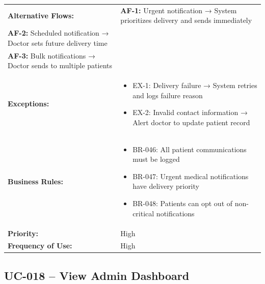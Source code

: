 \documentclass[12pt,a4paper]{article}
\begin{document}
\begin{longtable}{|p{4.5cm}|p{10.5cm}|}
\hline
\textbf{Alternative Flows:} &
\textbf{AF-1:} Urgent notification → System prioritizes delivery and sends immediately \\
\textbf{AF-2:} Scheduled notification → Doctor sets future delivery time \\
\textbf{AF-3:} Bulk notifications → Doctor sends to multiple patients \\
\hline
\textbf{Exceptions:} &
\begin{itemize}
  \item EX-1: Delivery failure → System retries and logs failure reason
  \item EX-2: Invalid contact information → Alert doctor to update patient record
\end{itemize} \\
\hline
\textbf{Business Rules:} &
\begin{itemize}
  \item BR-046: All patient communications must be logged
  \item BR-047: Urgent medical notifications have delivery priority
  \item BR-048: Patients can opt out of non-critical notifications
\end{itemize} \\
\hline
\textbf{Priority:} & High \\
\hline
\textbf{Frequency of Use:} & High \\
\hline
\end{longtable}

\subsection{UC-018 – View Admin Dashboard}
\end{document}
